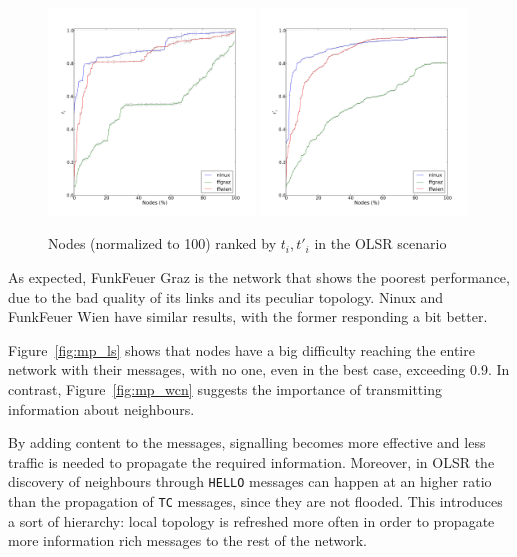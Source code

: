 \documentclass[a4paper,11pt,twoside,openleft]{memoir}
\newcommand{\figref}[1] {Figure~\ref{#1}}
\begin{document}
\begin{figure}[htb]
  \centering
  \hspace*{\fill}
  \includegraphics[width=0.49\textwidth]{graphs/all-mpr-Tc}
  \hfill
  \includegraphics[width=0.49\textwidth]{graphs/all-mpr-Rc}
  \hspace*{\fill}
  \caption{Nodes (normalized to 100) ranked by $t_i, t'_i$ in the OLSR scenario}
  \label{fig:mp_olsr}
\end{figure}

As expected, FunkFeuer Graz is the network that shows the poorest performance,
due to the bad quality of its links and its peculiar topology. Ninux and
FunkFeuer Wien have similar results, with the former responding a bit better.

\figref{fig:mp_ls} shows that nodes have a big difficulty reaching the entire
network with their messages, with no one, even in the best case, exceeding 0.9.
In contrast, \figref{fig:mp_wcn} suggests the importance of transmitting
information about neighbours.

By adding content to the messages, signalling becomes more effective and
less traffic is needed to propagate the required information.
Moreover, in OLSR the discovery of neighbours through \texttt{HELLO}
messages can happen at an higher ratio than the propagation of \texttt{TC}
messages, since they are not flooded.
This introduces a sort of hierarchy: local topology is refreshed more often
in order to propagate more information rich messages to the rest of the network.
\end{document}
